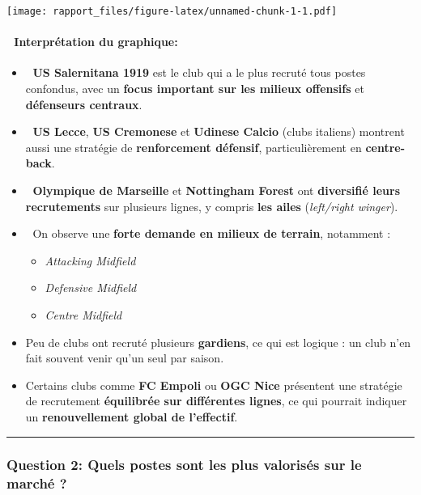 \documentclass[
]{article}
\providecommand{\tightlist}{%
  \setlength{\itemsep}{0pt}\setlength{\parskip}{0pt}}
\begin{document}
\texttt{[image: rapport\_files/figure-latex/unnamed-chunk-1-1.pdf]}

\paragraph{🧠 Interprétation du
graphique:}\label{interpruxe9tation-du-graphique}

\begin{itemize}
\item
  🔵 \textbf{US Salernitana 1919} est le club qui a le plus recruté tous
  postes confondus, avec un \textbf{focus important sur les milieux
  offensifs} et \textbf{défenseurs centraux}.
\item
  🔵 \textbf{US Lecce}, \textbf{US Cremonese} et \textbf{Udinese Calcio}
  (clubs italiens) montrent aussi une stratégie de \textbf{renforcement
  défensif}, particulièrement en \textbf{centre-back}.
\item
  🔵 \textbf{Olympique de Marseille} et \textbf{Nottingham Forest} ont
  \textbf{diversifié leurs recrutements} sur plusieurs lignes, y compris
  \textbf{les ailes} (\emph{left/right winger}).
\item
  🎯 On observe une \textbf{forte demande en milieux de terrain},
  notamment :

  \begin{itemize}
  \tightlist
  \item
    \emph{Attacking Midfield}
  \item
    \emph{Defensive Midfield}
  \item
    \emph{Centre Midfield}
  \end{itemize}
\item
  Peu de clubs ont recruté plusieurs \textbf{gardiens}, ce qui est
  logique : un club n'en fait souvent venir qu'un seul par saison.
\item
  Certains clubs comme \textbf{FC Empoli} ou \textbf{OGC Nice}
  présentent une stratégie de recrutement \textbf{équilibrée sur
  différentes lignes}, ce qui pourrait indiquer un
  \textbf{renouvellement global de l'effectif}.
\end{itemize}

\begin{center}\rule{0.5\linewidth}{0.5pt}\end{center}

\subsubsection{\texorpdfstring{\textbf{Question 2:} Quels postes sont
les plus valorisés sur le marché
?}{Question 2: Quels postes sont les plus valorisés sur le marché ?}}\label{question-2-quels-postes-sont-les-plus-valorisuxe9s-sur-le-marchuxe9}
\end{document}
